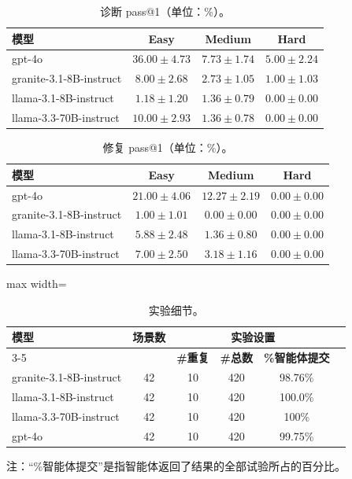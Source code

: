 \documentclass[10pt,UTF8,fontset=fandol]{ctexart}
\begin{document}
\begin{table}[H]
\centering
\caption{诊断 pass@1（单位：\%）。}
\label{tab:itb-tab17}
\begin{tabular}{lccc}
\toprule
\textbf{模型} & \textbf{Easy} & \textbf{Medium} & \textbf{Hard} \\
\midrule
gpt-4o & $36.00 \pm 4.73$ & $7.73 \pm 1.74$ & $5.00 \pm 2.24$ \\
granite-3.1-8B-instruct & $8.00 \pm 2.68$ & $2.73 \pm 1.05$ & $1.00 \pm 1.03$ \\
llama-3.1-8B-instruct & $1.18 \pm 1.20$ & $1.36 \pm 0.79$ & $0.00 \pm 0.00$ \\
llama-3.3-70B-instruct & $10.00 \pm 2.93$ & $1.36 \pm 0.78$ & $0.00 \pm 0.00$ \\
\bottomrule
\end{tabular}
\end{table}

\begin{table}[H]
\centering
\caption{修复 pass@1（单位：\%）。}
\label{tab:itb-tab18}
\begin{tabular}{lccc}
\toprule
\textbf{模型} & \textbf{Easy} & \textbf{Medium} & \textbf{Hard} \\
\midrule
gpt-4o & $21.00 \pm 4.06$ & $12.27 \pm 2.19$ & $0.00 \pm 0.00$ \\
granite-3.1-8B-instruct & $1.00 \pm 1.01$ & $0.00 \pm 0.00$ & $0.00 \pm 0.00$ \\
llama-3.1-8B-instruct & $5.88 \pm 2.48$ & $1.36 \pm 0.80$ & $0.00 \pm 0.00$ \\
llama-3.3-70B-instruct & $7.00 \pm 2.50$ & $3.18 \pm 1.16$ & $0.00 \pm 0.00$ \\
\bottomrule
\end{tabular}
\end{table}

\begin{table}[H]
\centering
\caption{实验细节。}
\label{tab:itb-tab16}
\begin{adjustbox}{max width=\linewidth}
\begin{tabular}{lccccc}
\toprule
\multirow{2}{*}{\textbf{模型}} & \multirow{2}{*}{\textbf{场景数}} & \multicolumn{3}{c}{\textbf{实验设置}} \\
\cmidrule(lr){3-5}
 & & \textbf{\#重复} & \textbf{\#总数} & \textbf{\%智能体提交} \\
\midrule
granite-3.1-8B-instruct & 42 & 10 & 420 & 98.76\% \\
llama-3.1-8B-instruct & 42 & 10 & 420 & 100.0\% \\
llama-3.3-70B-instruct & 42 & 10 & 420 & 100\% \\
gpt-4o & 42 & 10 & 420 & 99.75\% \\
\bottomrule
\end{tabular}
\end{adjustbox}

\footnotesize 注：“\%智能体提交”是指智能体返回了结果的全部试验所占的百分比。
\end{table}
\end{document}
